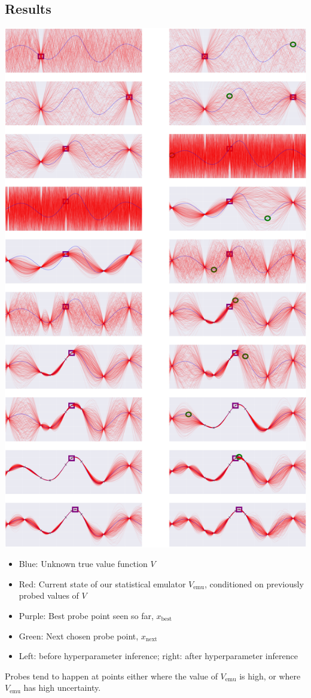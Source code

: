 \documentclass[a0,portrait]{a0poster}
\newcommand{\emu}{{\textrm{emu}}}
\newcommand{\rmnext}{{\textrm{next}}}
\newcommand{\best}{{\textrm{best}}}
\begin{document}
\begin{multicols}{3}
\subsection*{Results}
\begin{center}
  \includegraphics[width=20cm]{BayesOpt_gpmem_sequence.png}
\end{center}

\begin{itemize}
  \item Blue: Unknown true value function $V$
  \item Red: Current state of our statistical emulator $V_\emu$, conditioned on previously probed values of $V$
  \item Purple: Best probe point seen so far, $x_\best$
  \item Green: Next chosen probe point, $x_\rmnext$
  \item Left: before hyperparameter inference; right: after hyperparameter inference
\end{itemize}
Probes tend to happen at points either where the value of $V_\emu$ is high, or where $V_\emu$ has high uncertainty.


\end{multicols}
\end{document}
